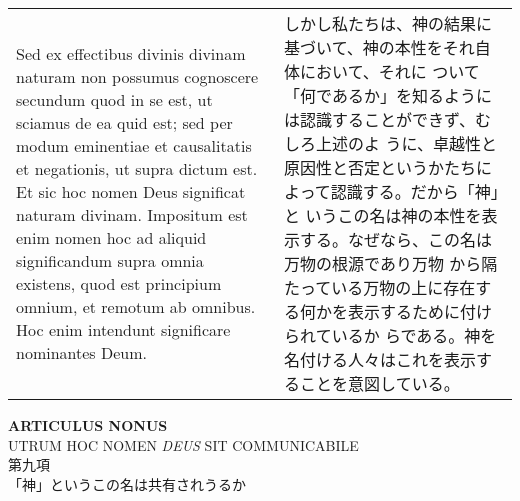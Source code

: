 \documentclass[paper=a4paper,fontsize=10pt,jafontsize=9pt,titlepage]{jlreq}
\begin{document}
\begin{longtable}{p{21em}p{21em}}
Sed ex effectibus divinis divinam naturam non possumus cognoscere
secundum quod in se est, ut sciamus de ea quid est; sed per modum
eminentiae et causalitatis et negationis, ut supra dictum est. Et sic
hoc nomen Deus significat naturam divinam. Impositum est enim nomen
hoc ad aliquid significandum supra omnia existens, quod est principium
omnium, et remotum ab omnibus. Hoc enim intendunt significare
nominantes Deum.

&

しかし私たちは、神の結果に基づいて、神の本性をそれ自体において、それに
ついて「何であるか」を知るようには認識することができず、むしろ上述のよ
うに、卓越性と原因性と否定というかたちによって認識する。だから「神」と
いうこの名は神の本性を表示する。なぜなら、この名は万物の根源であり万物
から隔たっている万物の上に存在する何かを表示するために付けられているか
らである。神を名付ける人々はこれを表示することを意図している。

\end{longtable}
\newpage
{}

\begin{center}
{\Large {\bfseries ARTICULUS NONUS}}\\
{\large UTRUM HOC NOMEN {\itshape DEUS} SIT COMMUNICABILE}\\
{\Large 第九項\\「神」というこの名は共有されうるか}
\end{center}
\end{document}
